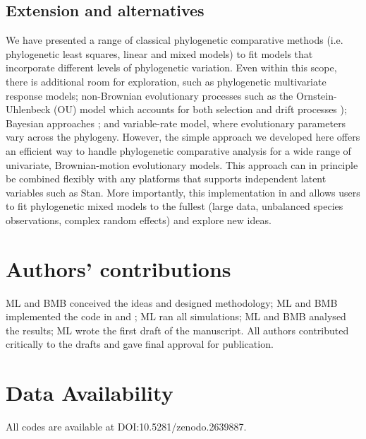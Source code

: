 \documentclass[12pt]{article}
\begin{document}
\subsection*{Extension and alternatives}

We have presented a range of classical phylogenetic comparative methods (i.e. phylogenetic least squares, linear and mixed models) to fit models that incorporate different levels of phylogenetic variation.
Even within this scope, there is additional room for exploration, such as phylogenetic multivariate response models; non-Brownian evolutionary processes such as the Ornstein-Uhlenbeck (OU) model which accounts for both selection and drift processes \citep{butler2004phylogenetic}); Bayesian approaches \citep{hadfield2010general}; and variable-rate model, where evolutionary parameters vary across the phylogeny.
However, the simple approach we developed here offers an efficient way to handle phylogenetic comparative analysis for a wide range of univariate, Brownian-motion evolutionary models. 
This approach can in principle be combined flexibly with any platforms that supports independent latent variables such as Stan.
More importantly, this implementation in  and  allows users to fit phylogenetic mixed models to the fullest (large data, unbalanced species observations, complex random effects) and explore new ideas.

\section*{Authors’ contributions}

ML and BMB conceived the ideas and designed methodology; ML and BMB implemented the code in  and ; ML ran all simulations; ML and BMB analysed the results; ML wrote the first draft of the manuscript. All authors contributed critically to the drafts and gave final approval for publication.

\section*{Data Availability}

All codes are available at DOI:10.5281/zenodo.2639887.

% 
\end{document}
